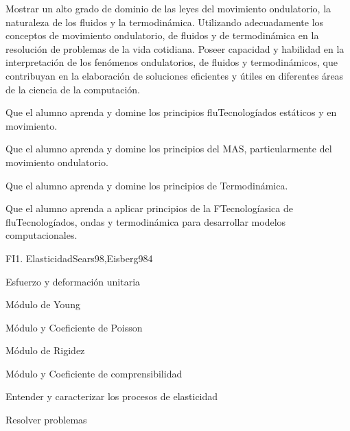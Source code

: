 \begin{syllabus}


\begin{justification}
Mostrar un alto grado de dominio de las leyes del movimiento ondulatorio, la naturaleza de los fluidos y la termodinámica. Utilizando adecuadamente los conceptos de movimiento ondulatorio, de fluidos y de termodinámica en la resolución de problemas de la vida cotidiana. Poseer capacidad y habilidad en la interpretación de los fenómenos ondulatorios, de fluidos y termodinámicos, que contribuyan en la elaboración de soluciones eficientes y útiles en diferentes áreas de la ciencia de la computación.
\end{justification}

\begin{goals}
\item  Que el alumno aprenda y domine los principios fluTecnologíados estáticos y en movimiento.
\item  Que el alumno aprenda y domine los principios del MAS, particularmente del movimiento ondulatorio.
\item  Que el alumno aprenda y domine los principios de Termodinámica.
\item  Que el alumno aprenda a aplicar principios de la FTecnologíasica de fluTecnologíados, ondas y termodinámica para desarrollar modelos computacionales.
\end{goals}

\begin{outcomes}
\end{outcomes}

\begin{unit}{FI1. Elasticidad}{Sears98,Eisberg98}{4}
\begin{topics}
         \item  Esfuerzo y deformación unitaria
	 \item  Módulo de Young
         \item  Módulo y Coeficiente de Poisson
	 \item  Módulo de Rigidez
         \item  Módulo y Coeficiente de comprensibilidad
   \end{topics}

   \begin{unitgoals}
         \item  Entender y caracterizar los procesos de elasticidad
         \item  Resolver problemas
   \end{unitgoals}
\end{unit}


\end{syllabus}
